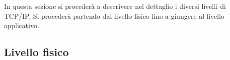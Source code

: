\documentclass{subfiles}
\begin{document}
In questa sezione si procederà a descrivere nel dettaglio i diversi livelli di TCP/IP.
Si procederà partendo dal livello fisico fino a giungere al livello applicativo.

\subsection{Livello fisico}

\end{document}
